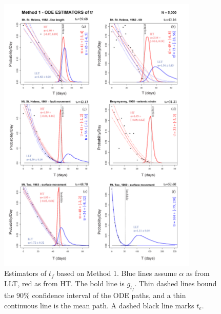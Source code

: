\documentclass{article}
\begin{document}
\begin{figure}[H]\vskip-0.5cm
\centering
\includegraphics[width=0.85\textwidth]{Fig5_plus.png}
\caption{Estimators of $t_f$ based on Method 1. Blue lines assume $\alpha$ as from LLT, red as from HT. The bold line is $g_{t_f}$. Thin dashed lines bound the $90\%$ confidence interval of the ODE paths, and a thin continuous line is the mean path. A dashed black line marks $t_e$.}
\label{Fig5}
\end{figure}
\end{document}
